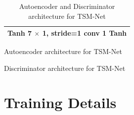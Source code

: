 \documentclass[12pt]{article}
\begin{document}
\begin{appendices}
\begin{table}[ht]
\begin{subtable}{.49\linewidth}
{\begin{tabular}{c}
      Tanh 7 $\times$ 1, stride=1 conv 1 Tanh\\
      \midrule
      \bottomrule
  \end{tabular}
  }
	\caption{Autoencoder architecture for TSM-Net }
  \end{subtable}
  \begin{subtable}{.49\linewidth}
	\caption{Discriminator architecture for TSM-Net }
  \end{subtable}
\caption{Autoencoder and Discriminator architecture for TSM-Net}
\label{tab:arch-a-d}
\end{table}

\section{Training Details}


\end{appendices}
\end{document}
